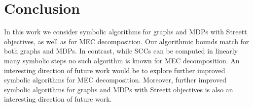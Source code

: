 \section{Conclusion}\label{sec:conc}

In this work we consider symbolic algorithms for graphs and MDPs with 
Streett objectives, as well as for MEC decomposition. 
Our algorithmic bounds match for both graphs and MDPs. 
In contrast, while SCCs can be computed in linearly many symbolic steps no such
algorithm is known for MEC decomposition.
An interesting direction of future work would be to explore further 
improved symbolic algorithms for MEC decomposition.
Moreover, further improved symbolic algorithms for graphs and MDPs with Streett
objectives is also an interesting direction of future work.
